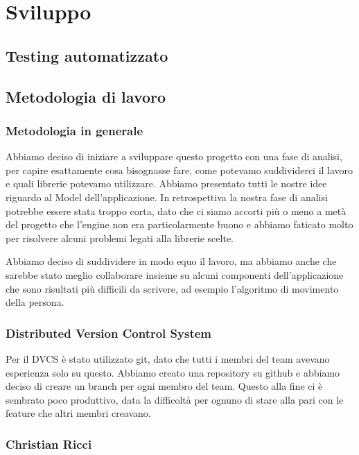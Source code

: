 \chapter{Sviluppo}

\section{Testing automatizzato}


\section{Metodologia di lavoro}

\subsection{Metodologia in generale}

Abbiamo deciso di iniziare a sviluppare questo progetto con una fase di analisi, per capire esattamente cosa bisognasse fare, come potevamo suddividerci il lavoro e quali librerie potevamo utilizzare. Abbiamo presentato tutti le nostre idee riguardo al Model dell'applicazione. In retrospettiva la nostra fase di analisi potrebbe essere stata troppo corta, dato che ci siamo accorti più o meno a metà del progetto che l'engine non era particolarmente buono e abbiamo faticato molto per risolvere alcuni problemi legati alla librerie scelte.

Abbiamo deciso di suddividere in modo equo il lavoro, ma abbiamo anche che sarebbe stato meglio collaborare insieme su alcuni componenti dell'applicazione che sono risultati più difficili da scrivere, ad esempio l'algoritmo di movimento della persona.

\subsection{Distributed Version Control System}

Per il DVCS è stato utilizzato git, dato che tutti i membri del team avevano esperienza solo su questo. Abbiamo creato una repository su github e abbiamo deciso di creare un branch per ogni membro del team. Questo alla fine ci è sembrato poco produttivo, data la difficoltà per ognuno di stare alla pari con le feature che altri membri creavano.

\subsection{Christian Ricci}

